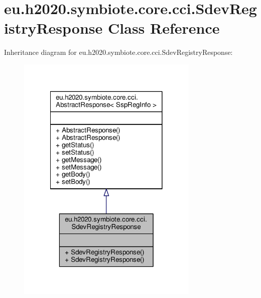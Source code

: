 \hypertarget{classeu_1_1h2020_1_1symbiote_1_1core_1_1cci_1_1SdevRegistryResponse}{}\section{eu.\+h2020.\+symbiote.\+core.\+cci.\+Sdev\+Registry\+Response Class Reference}
\label{classeu_1_1h2020_1_1symbiote_1_1core_1_1cci_1_1SdevRegistryResponse}


Inheritance diagram for eu.\+h2020.\+symbiote.\+core.\+cci.\+Sdev\+Registry\+Response\+:
\nopagebreak
\begin{figure}[H]
\begin{center}
\leavevmode
\includegraphics[width=246pt]{classeu_1_1h2020_1_1symbiote_1_1core_1_1cci_1_1SdevRegistryResponse__inherit__graph}
\end{center}
\end{figure}


